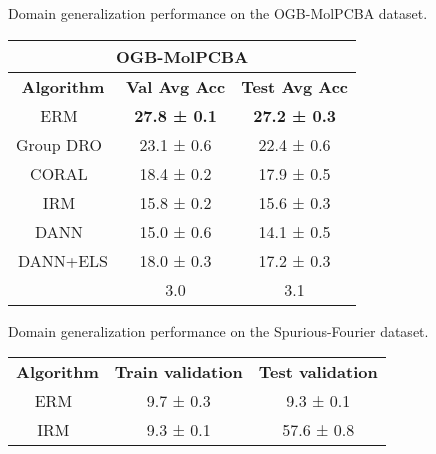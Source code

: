 \documentclass{article} \usepackage{iclr2023_conference,times}
\newcommand{\abbr}[0]{DANN+ELS\xspace}
\newcommand{\Gray}[0]{\rowcolor{gray!20}}
\begin{document}
\begin{minipage}{\textwidth}
\centering
 \begin{minipage}[t]{0.48\textwidth}
  \centering
  \tiny
\makeatletter{}\makeatother\caption{Domain generalization performance on the OGB-MolPCBA dataset.}\label{tab:main_graph2}
\begin{tabular}{@{}ccc@{}}
\toprule
\multicolumn{3}{c}{{\color{brown}\textbf{OGB-MolPCBA}}}                                            \\ \midrule
\textbf{Algorithm} & \textbf{Val Avg Acc} & \textbf{Test Avg Acc} \\
ERM~\citep{vapnik1998statistical}                 &\textbf{ 27.8 ± 0.1 }                & \textbf{27.2 ± 0.3}                  \\
Group DRO~\cite{sagawa2020distributionally}            & 23.1 ± 0.6                 & 22.4 ± 0.6                  \\
CORAL~\cite{sun2016deep}              & 18.4 ± 0.2                 & 17.9 ± 0.5                  \\
IRM~\citep{arjovsky2020invariant}                 & 15.8 ± 0.2                 & 15.6 ± 0.3                  \\
DANN~\citep{ganin2016domain}                & 15.0 ± 0.6              & 14.1 ± 0.5               \\\Gray
\abbr               & 18.0 ± 0.3              & 17.2 ± 0.3               \\\Gray
         & 3.0                       & 3.1                        \\ \bottomrule
\end{tabular}
  \end{minipage}
  \begin{minipage}[t]{0.48\textwidth}
   \centering
   \tiny
\makeatletter{}\makeatother\caption{Domain generalization performance on the Spurious-Fourier dataset.}\label{tab:sp_fourier}
 \begin{tabular}{@{}
>{\columncolor[HTML]{FFFFFF}}c 
>{\columncolor[HTML]{FFFFFF}}c 
>{\columncolor[HTML]{FFFFFF}}c @{}}
\toprule
\multicolumn{3}{c}{{\color{brown}\textbf{Spurious-Fourier dataset}}}        \\ \midrule
\textbf{Algorithm }           & \textbf{Train validation} & \textbf{Test validation} \\
ERM~\citep{vapnik1998statistical}                   & 9.7 ± 0.3               & 9.3 ± 0.1              \\
IRM~\citep{arjovsky2020invariant}                  & 9.3 ± 0.1               & 57.6 ± 0.8             \\

\end{tabular}
\end{minipage}
\end{minipage}
\end{document}
